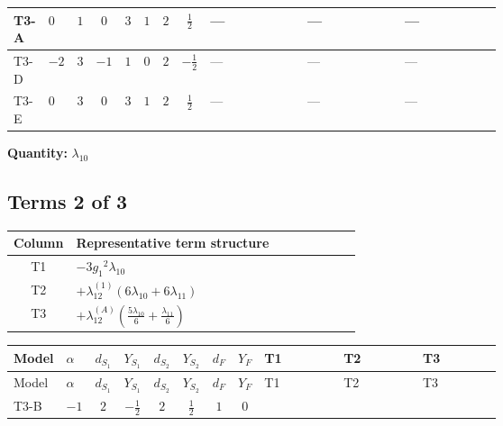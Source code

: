 \documentclass[8pt]{article}
\begin{document}
\begin{landscape}
\begin{longtable}{@{}llcccccc >{\raggedright\arraybackslash}p{0.21\linewidth} >{\raggedright\arraybackslash}p{0.21\linewidth} >{\raggedright\arraybackslash}p{0.21\linewidth}@{}}
\midrule
T3-A & $0$ & $1$ & $0$ & $3$ & $1$ & $2$ & $\frac{1}{2}$ & --- & --- & --- \\
\midrule
T3-D & $-2$ & $3$ & $-1$ & $1$ & $0$ & $2$ & $-\frac{1}{2}$ & --- & --- & --- \\
\midrule
T3-E & $0$ & $3$ & $0$ & $3$ & $1$ & $2$ & $\frac{1}{2}$ & --- & --- & --- \\
\midrule
\bottomrule
\end{longtable}
\clearpage
\noindent\textbf{Quantity: }$\lambda_{10}$\par\smallskip
\subsection*{Terms 2 of 3}
\begin{center}
\begin{tabular}{@{}c >{\raggedright\arraybackslash}p{0.82\linewidth}@{}}
\toprule
Column & Representative term structure \\
\midrule
T1 & \(\displaystyle -3 {g_1}^2 {\lambda_{10}}\) \\
\midrule
T2 & \(\displaystyle +{\lambda_{12}^{(1)}} (6 {\lambda_{10}}+6 {\lambda_{11}})\) \\
\midrule
T3 & \(\displaystyle +{\lambda_{12}^{(A)}} \left(\frac{5 {\lambda_{10}}}{6}+\frac{{\lambda_{11}}}{6}\right)\) \\
\midrule
\bottomrule
\end{tabular}
\end{center}
\smallskip
\tiny
\begin{longtable}{@{}llcccccc >{\raggedright\arraybackslash}p{0.21\linewidth} >{\raggedright\arraybackslash}p{0.21\linewidth} >{\raggedright\arraybackslash}p{0.21\linewidth}@{}}
\toprule
Model & $\alpha$ & $d_{S_1}$ & $Y_{S_1}$ & $d_{S_2}$ & $Y_{S_2}$ & $d_F$ & $Y_F$ & T1 & T2 & T3 \\
\midrule
\endfirsthead
\toprule
Model & $\alpha$ & $d_{S_1}$ & $Y_{S_1}$ & $d_{S_2}$ & $Y_{S_2}$ & $d_F$ & $Y_F$ & T1 & T2 & T3 \\
\midrule
\endhead
T3-B & $-1$ & $2$ & $-\frac{1}{2}$ & $2$ & $\frac{1}{2}$ & $1$ & $0$ & \scriptsize\adjustbox{max width=\linewidth}{$\begin{gathered} -3 {g_1}^2 {\lambda_{10}}\end{gathered}$} & \scriptsize\adjustbox{max width=\linewidth}{$\begin{gathered} +{\lambda_{12}^{(1)}} (6 {\lambda_{10}}+6 {\lambda_{11}})\end{gathered}$} & \scriptsize\adjustbox{max width=\linewidth}{$\begin{gathered} +{\lambda_{12}^{(A)}} \left(\frac{5 {\lambda_{10}}}{6}+\frac{{\lambda_{11}}}{6}\right)\end{gathered}$} \\

\end{longtable}
\end{landscape}
\end{document}
